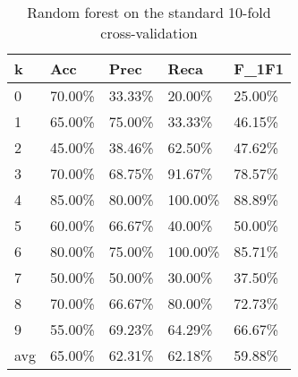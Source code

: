 \documentclass{article}
\begin{document}
\begin{table}[h]
	\centering
	\caption{Random forest on the standard 10-fold cross-validation}
	\begin{tabular}{|l|l|l|l|l|}
	\hline
	\textbf{k} & \textbf{Acc} & \textbf{Prec} & \textbf{Reca} & \textbf{F\_1F1} \\ \hline
	0          & 70.00\%      & 33.33\%       & 20.00\%       & 25.00\%         \\ \hline
	1          & 65.00\%      & 75.00\%       & 33.33\%       & 46.15\%         \\ \hline
	2          & 45.00\%      & 38.46\%       & 62.50\%       & 47.62\%         \\ \hline
	3          & 70.00\%      & 68.75\%       & 91.67\%       & 78.57\%         \\ \hline
	4          & 85.00\%      & 80.00\%       & 100.00\%      & 88.89\%         \\ \hline
	5          & 60.00\%      & 66.67\%       & 40.00\%       & 50.00\%         \\ \hline
	6          & 80.00\%      & 75.00\%       & 100.00\%      & 85.71\%         \\ \hline
	7          & 50.00\%      & 50.00\%       & 30.00\%       & 37.50\%         \\ \hline
	8          & 70.00\%      & 66.67\%       & 80.00\%       & 72.73\%         \\ \hline
	9          & 55.00\%      & 69.23\%       & 64.29\%       & 66.67\%         \\ \hline
	avg        & 65.00\%      & 62.31\%       & 62.18\%       & 59.88\%         \\ \hline
	\end{tabular}
	\end{table}
\end{document}
